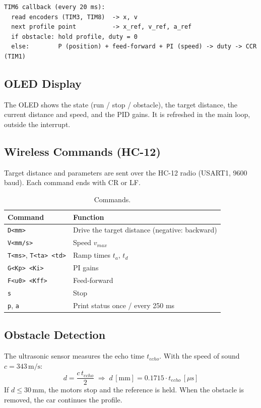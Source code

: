 \documentclass[11pt,a4paper]{article}
\begin{document}
\begin{verbatim}
TIM6 callback (every 20 ms):
  read encoders (TIM3, TIM8)  -> x, v
  next profile point          -> x_ref, v_ref, a_ref
  if obstacle: hold profile, duty = 0
  else:        P (position) + feed-forward + PI (speed) -> duty -> CCR (TIM1)
\end{verbatim}

\subsection{OLED Display}
The OLED shows the state (run / stop / obstacle), the target distance,
the current distance and speed, and the PID gains.
It is refreshed in the main loop, outside the interrupt.

\subsection{Wireless Commands (HC-12)}
Target distance and parameters are sent over the HC-12 radio (USART1, 9600 baud).
Each command ends with CR or LF.

\begin{table}[H]
  \centering
  \caption{Commands.}
  \begin{tabular}{@{}ll@{}}
    \toprule
    \textbf{Command} & \textbf{Function} \\ \midrule
    \texttt{D<mm>}             & Drive the target distance (negative: backward) \\
    \texttt{V<mm/s>}           & Speed \(v_{max}\) \\
    \texttt{T<ms>}, \texttt{T<ta> <td>} & Ramp times \(t_a\), \(t_d\) \\
    \texttt{G<Kp> <Ki>}        & PI gains \\
    \texttt{F<u0> <Kff>}       & Feed-forward \\
    \texttt{s}                 & Stop \\
    \texttt{p}, \texttt{a}     & Print status once / every 250 ms \\ \bottomrule
  \end{tabular}
\end{table}

\subsection{Obstacle Detection}
The ultrasonic sensor measures the echo time \(t_{echo}\).
With the speed of sound \(c = 343\,\mathrm{m/s}\):
\begin{equation}
  d = \frac{c\,t_{echo}}{2}
  \;\Rightarrow\;
  d\,[\mathrm{mm}] = 0.1715 \cdot t_{echo}\,[\mu\mathrm{s}]
\end{equation}
If \(d \le 30\,\mathrm{mm}\), the motors stop and the reference is held.
When the obstacle is removed, the car continues the profile.
\end{document}
